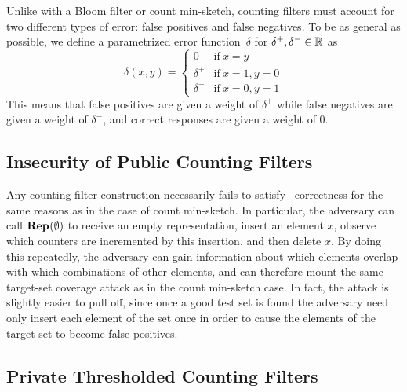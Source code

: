 %
Unlike with a Bloom filter or count min-sketch, counting filters must account
for two different types of error: false positives and false negatives. To be as
general as possible, we define a parametrized error function~$\delta$ for
$\delta^+, \delta^- \in \mathbb{R}$ as
\begin{equation}
  \delta(x, y) =
  \begin{cases}
    0 & \text{if}\ x = y \\
    \delta^+ & \text{if}\ x = 1, y = 0 \\
    \delta^- & \text{if}\ x = 0, y = 1
  \end{cases}
\end{equation}
This means that false positives are given a weight of $\delta^+$ while false
negatives are given a weight of $\delta^-$, and correct responses are given a
weight of 0.

\subsection{Insecurity of Public Counting Filters}
Any counting filter construction necessarily fails to satisfy \errep\
correctness for the same reasons as in the case of count min-sketch. In
particular, the adversary can call $\textup{\textbf{Rep}}\hspace{0.5pt}(\emptyset)$ to receive an empty
representation, insert an element $x$, observe which counters are incremented by
this insertion, and then delete $x$. By doing this repeatedly, the adversary can
gain information about which elements overlap with which combinations of other
elements, and can therefore mount the same target-set coverage attack as in the
count min-sketch case. In fact, the attack is slightly easier to pull off, since
once a good test set is found the adversary need only insert each element of the
set once in order to cause the elements of the target set to become false
positives.

\subsection{Private Thresholded Counting Filters}

